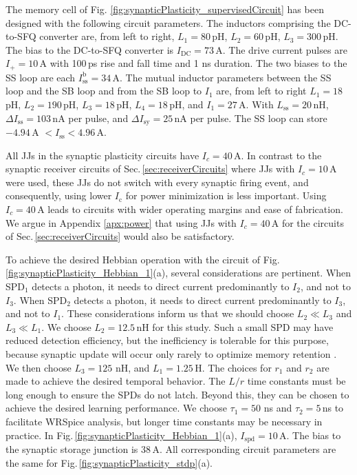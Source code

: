 \documentclass[twocolumn]{article}
\begin{document}
The memory cell of Fig. \ref{fig:synapticPlasticity_supervisedCircuit} has been designed with the following circuit parameters. The inductors comprising the DC-to-SFQ converter are, from left to right, $L_1 = 80$\,pH, $L_2 = 60$\,pH, $L_3 = 300$\,pH. The bias to the DC-to-SFQ converter is $I_{\mathrm{DC}} = 73$\,\textmu A. The drive current pulses are $I_{+} = 10$\,\textmu A with 100\,ps rise and fall time and 1 ns duration. The two biases to the SS loop are each $I_{\mathrm{ss}}^{\mathrm{b}} = 34$\,\textmu A. The mutual inductor parameters between the SS loop and the SB loop and from the SB loop to $I_1$ are, from left to right $L_1 = 18$\,pH, $L_2 = 190$\,pH, $L_3 = 18$\,pH, $L_4 = 18$\,pH, and $I_1 = 27$\,\textmu A. With $L_{\mathrm{ss}} = 20$\,nH, $\Delta I_{\mathrm{ss}} = 103$\,nA per pulse, and $\Delta I_{\mathrm{sy}} = 25$\,nA per pulse. The SS loop can store $-4.94$\,\textmu A $< I_{\mathrm{ss}} < 4.96$\,\textmu A.

All JJs in the synaptic plasticity circuits have $I_c = 40$\,\textmu A. In contrast to the synaptic receiver circuits of Sec.\,\ref{sec:receiverCircuits} where JJs with $I_c = 10$\,\textmu A were used, these JJs do not switch with every synaptic firing event, and consequently, using lower $I_{\mathrm{c}}$ for power minimization is less important. Using $I_c = 40$\,\textmu A leads to circuits with wider operating margins and ease of fabrication. We argue in Appendix \ref{apx:power} that using JJs with $I_c = 40$\,\textmu A for the circuits of Sec.\,\ref{sec:receiverCircuits} would also be satisfactory.

To achieve the desired Hebbian operation with the circuit of Fig.\,\ref{fig:synapticPlasticity_Hebbian_1}(a), several considerations are pertinent. When SPD$_1$ detects a photon, it needs to direct current predominantly to $I_2$, and not to $I_3$. When SPD$_2$ detects a photon, it needs to direct current predominantly to $I_3$, and not to $I_1$. These considerations inform us that we should choose $L_2 \ll L_3$ and $L_3 \ll L_1$. We choose $L_2 = 12.5$\,nH for this study. Such a small SPD may have reduced detection efficiency, but the inefficiency is tolerable for this purpose, because synaptic update will occur only rarely to optimize memory retention \cite{fuab2007,lide2015}. We then choose $L_3 = 125$ nH, and $L_1 = 1.25$\,\textmu H. The choices for $r_1$ and $r_2$ are made to achieve the desired temporal behavior. The $L/r$ time constants must be long enough to ensure the SPDs do not latch. Beyond this, they can be chosen to achieve the desired learning performance. We choose $\tau_1 = 50$ ns and $\tau_2 = 5$\,ns to facilitate WRSpice analysis, but longer time constants may be necessary in practice. In Fig.\,\ref{fig:synapticPlasticity_Hebbian_1}(a), $I_{\mathrm{spd}} = 10$\,\textmu A. The bias to the synaptic storage junction is 38\,\textmu A. All corresponding circuit parameters are the same for Fig.\,\ref{fig:synapticPlasticity_stdp}(a).
\end{document}
